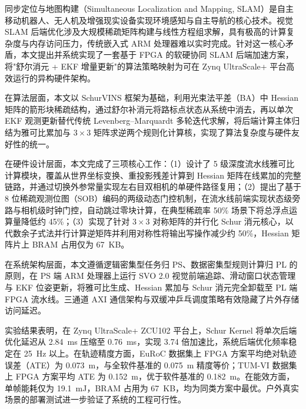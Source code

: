 同步定位与地图构建（Simultaneous Localization and Mapping, SLAM）是自主移动机器人、无人机及增强现实设备实现环境感知与自主导航的核心技术。视觉 SLAM 后端优化涉及大规模稀疏矩阵构建与线性方程组求解，具有极高的计算复杂度与内存访问压力，传统嵌入式 ARM 处理器难以实时完成。针对这一核心矛盾，本文提出并系统实现了一套基于 FPGA 的软硬协同 SLAM 后端加速方案，将"舒尔消元 + EKF 增量更新"的算法策略映射为可在 Zynq UltraScale+ 平台高效运行的异构硬件架构。

在算法层面，本文以 SchurVINS 框架为基础，利用光束法平差（BA）中 Hessian 矩阵的箭形块稀疏结构，通过舒尔补消元将路标点状态从系统中消去，再以单次 EKF 观测更新替代传统 Levenberg--Marquardt 多轮迭代求解，将后端计算主体归结为雅可比累加与 $3 \times 3$ 矩阵求逆两个规则化计算核，实现了算法复杂度与硬件友好性的统一。

在硬件设计层面，本文完成了三项核心工作：（1）设计了 5 级深度流水线雅可比计算模块，覆盖从世界坐标变换、重投影残差计算到 Hessian 矩阵在线累加的完整链路，并通过切换外参常量实现左右目双相机的单硬件路径复用；（2）提出了基于 8 位稀疏观测位图（SOB）编码的两级动态门控机制，在流水线前端实现状态级旁路与相机级时钟门控，自动跳过零块计算，在典型稀疏率 50\% 场景下将总浮点运算量降低约 45\%；（3）实现了针对 $3 \times 3$ 对称矩阵的并行化 Schur 消元核心，以代数余子式法并行计算逆矩阵并利用对称性将输出写操作减少约 50\%，Hessian 矩阵片上 BRAM 占用仅为 67~KB。

在系统架构层面，本文遵循逻辑密集型任务归 PS、数据密集型规则计算归 PL 的原则，在 PS 端 ARM 处理器上运行 SVO 2.0 视觉前端追踪、滑动窗口状态管理与 EKF 位姿更新，将雅可比生成、Hessian 累加与 Schur 消元完全卸载至 PL 端 FPGA 流水线。三通道 AXI 通信架构与双缓冲乒乓调度策略有效隐藏了片外存储访问延迟。

实验结果表明，在 Zynq UltraScale+ ZCU102 平台上，Schur Kernel 将单次后端优化延迟从 2.84~ms 压缩至 0.76~ms，实现 3.74 倍加速比，系统后端优化频率稳定在 25~Hz 以上。在轨迹精度方面，EuRoC 数据集上 FPGA 方案平均绝对轨迹误差（ATE）为 0.073~m，与全软件基准的 0.075~m 精度等价；TUM-VI 数据集上 FPGA 方案平均 ATE 为 0.152~m，优于软件基准的 0.182~m。在能效方面，单帧能耗仅为 19.1~mJ，BRAM 占用为 67~KB，均为同类方案中最优。户外真实场景的部署测试进一步验证了系统的工程可行性。

